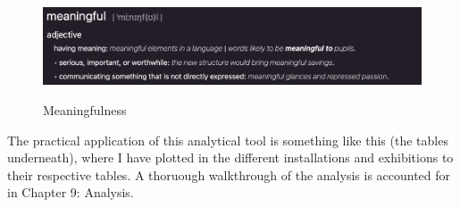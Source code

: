 \begin{figure}[H]
\includegraphics[width=12.5cm]{pictures/background/meaningful.png}
\caption{Meaningfulness}{\autocite{Oxford_dictionary}}
\centering
\end{figure}

The practical application of this analytical tool is something like this (the tables underneath), where I have plotted in the different installations and exhibitions to their respective tables. A thoruough walkthrough of the analysis is accounted for in Chapter 9: Analysis.
